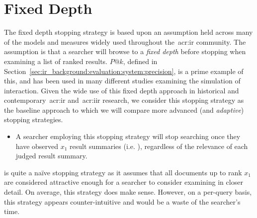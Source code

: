 \section{Fixed Depth}\label{sec:strategies:fixed}
The fixed depth stopping strategy is based upon an assumption held across many of the models and measures widely used throughout the~\gls{acr:ir} community. The assumption is that a searcher will browse to a \emph{fixed depth} before stopping when examining a list of ranked results. $P@k$, defined in Section~\ref{sec:ir_background:evaluation:system:precision}, is a prime example of this, and has been used in many different studies examining the simulation of interaction. Given the wide use of this fixed depth approach in historical and contemporary~\gls{acr:ir} and~\gls{acr:iir} research, we consider this stopping strategy as the baseline approach to which we will compare more advanced (and \emph{adaptive}) stopping strategies.

\begin{itemize}
    \item{} A searcher employing this stopping strategy will stop searching once they have observed $x_1$ result summaries (i.e. ), regardless of the relevance of each judged result summary.
\end{itemize}

 is quite a na\"{i}ve stopping strategy as it assumes that all documents up to rank $x_1$ are considered attractive enough for a searcher to consider examining in closer detail. On average, this strategy does make sense. However, on a per-query basis, this strategy appears counter-intuitive and would be a waste of the searcher's time.

